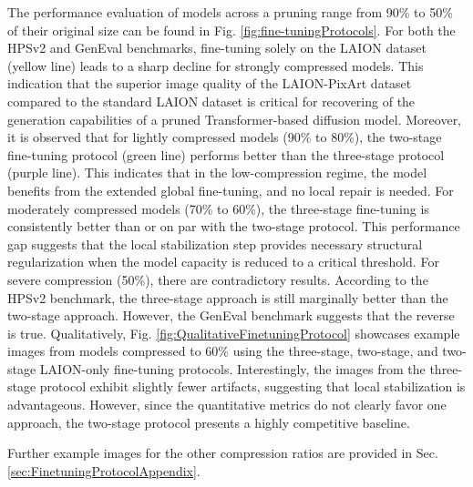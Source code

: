   	
 The performance evaluation of models across a pruning range from 90\% to 50\% of their original size can be found in Fig. \ref{fig:fine-tuningProtocols}. For both the HPSv2 and GenEval benchmarks, fine-tuning solely on the LAION dataset (yellow line) leads to a sharp decline for strongly compressed models. This indication that the superior image quality of the LAION-PixArt dataset compared to the standard LAION dataset is critical for recovering of the generation capabilities of a pruned Transformer-based diffusion model. Moreover, it is observed that for lightly compressed models (90\% to 80\%), the two-stage fine-tuning protocol (green line) performs better than the three-stage protocol (purple line). This indicates that in the low-compression regime, the model benefits from the extended global fine-tuning, and no local repair is needed. For moderately compressed models (70\% to 60\%), the three-stage fine-tuning is consistently better than or on par with the two-stage protocol. This performance gap suggests that the local stabilization step provides necessary structural regularization when the model capacity is reduced to a critical threshold. For severe compression (50\%), there are contradictory results. According to the HPSv2 benchmark, the three-stage approach is still marginally better than the two-stage approach. However, the GenEval benchmark suggests that the reverse is true. Qualitatively, Fig. \ref{fig:QualitativeFinetuningProtocol} showcases example images from models compressed to 60\% using the three-stage, two-stage, and two-stage LAION-only fine-tuning protocols. Interestingly, the images from the three-stage protocol exhibit slightly fewer artifacts, suggesting that local stabilization is advantageous. However, since the quantitative metrics do not clearly favor one approach, the two-stage protocol presents a highly competitive baseline.
 
 Further example images for the other compression ratios are provided in Sec. \ref{sec:FinetuningProtocolAppendix}.
 
 
